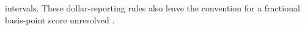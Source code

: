 intervals. These dollar-reporting rules also leave the convention for a
fractional basis-point score unresolved
\citep[GEN-3--4 and C-1; physical pp.~7--8, 25]{fry15instructionsretained2026}.
